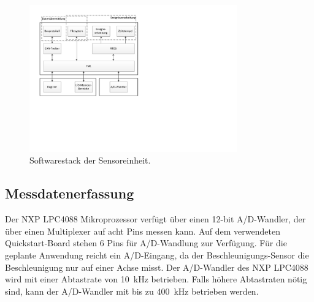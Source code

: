 \begin{figure}[H]
	\centering
		\includegraphics[width=0.8\textwidth]{images/visio/Softwarestack_Sensor.pdf}
	\caption{Softwarestack der Sensoreinheit.}
	\label{fig.sw_sensor}
\end{figure}



\subsection{Messdatenerfassung}\label{subsec.sw_messen}
Der NXP LPC4088 Mikroprozessor verfügt über einen 12-bit A/D-Wandler, der über einen Multiplexer auf acht Pins messen kann. Auf dem verwendeten Quickstart-Board stehen 6 Pins für A/D-Wandlung zur Verfügung. Für die geplante Anwendung reicht ein A/D-Eingang, da der Beschleunigungs-Sensor die Beschleunigung nur auf einer Achse misst. Der A/D-Wandler des NXP LPC4088 wird mit einer Abtastrate von 10~kHz betrieben. Falls höhere Abtastraten nötig sind, kann der A/D-Wandler mit bis zu 400~kHz betrieben werden.



